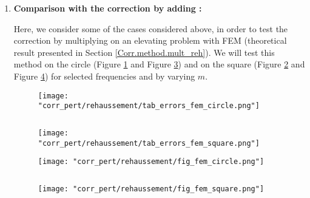 \begin{enumerate}[label=\textbullet]
	\item \textbf{Comparison with the correction by adding :}
	
	Here, we consider some of the cases considered above, in order to test the correction by multiplying on an elevating problem with FEM (theoretical result presented in Section \ref{Corr.method.mult_reh}). We will test this method on the circle (Figure \ref{corr_pert_fem_circle_reh} and Figure \ref{corr_pert_fem_circle_reh_fig}) and on the square (Figure \ref{corr_pert_fem_square_reh} and Figure \ref{corr_pert_fem_square_reh_fig}) for selected frequencies and by varying $m$.
	
	\begin{minipage}{0.48\linewidth}
		\begin{figure}[H]
			\centering
			\texttt{[image: "corr\_pert/rehaussement/tab\_errors\_fem\_circle.png"]}
			\label{corr_pert_fem_circle_reh}
		\end{figure} 
	\end{minipage} $\qquad$
	\begin{minipage}{0.48\linewidth}
		\begin{figure}[H]
			\centering
			\texttt{[image: "corr\_pert/rehaussement/tab\_errors\_fem\_square.png"]}
			\label{corr_pert_fem_square_reh}
		\end{figure} 
	\end{minipage}
	
	\begin{minipage}{0.48\linewidth}
		\begin{figure}[H]
			\centering
			\texttt{[image: "corr\_pert/rehaussement/fig\_fem\_circle.png"]}
			\label{corr_pert_fem_circle_reh_fig}
		\end{figure} 
	\end{minipage} $\qquad$
	\begin{minipage}{0.48\linewidth}
		\begin{figure}[H]
			\centering
			\texttt{[image: "corr\_pert/rehaussement/fig\_fem\_square.png"]}
			\label{corr_pert_fem_square_reh_fig}
		\end{figure} 
	\end{minipage}
	

\end{enumerate}
